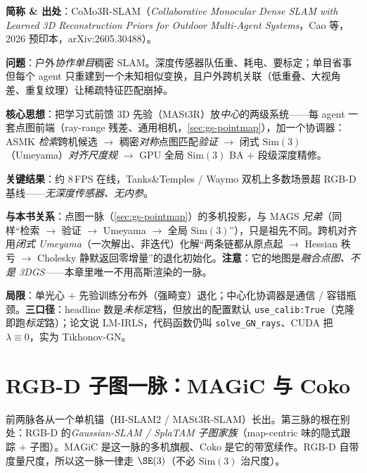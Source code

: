 \begin{paper}
\textbf{简称 \& 出处}：CoMo3R-SLAM（\emph{Collaborative Monocular Dense SLAM with Learned 3D Reconstruction Priors for Outdoor Multi-Agent Systems}，Cao 等，2026 预印本，arXiv:2605.30488）\cite{cao2026como3rslam}。

\textbf{问题}：户外\emph{协作单目}稠密 SLAM。深度传感器队伍重、耗电、要标定；单目省事但每个 agent 只重建到一个未知相似变换，且户外跨机关联（低重叠、大视角差、重复纹理）让稀疏特征匹配崩掉。

\textbf{核心思想}：把学习式前馈 3D 先验（MASt3R）放\emph{中心}的两级系统——每 agent 一套点图前端（ray-range 残差、通用相机，\cref{sec:gs-pointmap}），加一个协调器：ASMK \emph{检索}跨机候选 $\to$ 稠密\emph{对称}点图匹配\emph{验证} $\to$ 闭式 $\mathrm{Sim}(3)$（Umeyama）\emph{对齐尺度规} $\to$ GPU 全局 $\mathrm{Sim}(3)$ BA $+$ 段级深度精修。

\textbf{关键结果}：约 8\,FPS 在线，Tanks\&Temples / Waymo 双机上多数场景超 RGB-D 基线——\emph{无深度传感器、无内参}。

\textbf{与本书关系}：点图一脉（\cref{sec:gs-pointmap}）的多机投影，与 MAGS \emph{兄弟}（同样“检索 $\to$ 验证 $\to$ Umeyama $\to$ 全局 $\mathrm{Sim}(3)$”），只是祖先不同。跨机对齐用\emph{闭式 Umeyama}（一次解出、非迭代）化解“两条链都从原点起 $\to$ Hessian 秩亏 $\to$ Cholesky 静默返回零增量”的退化初始化。\textbf{注意}：它的地图是\emph{融合点图、不是 3DGS}——本章里唯一不用高斯渲染的一脉。

\textbf{局限}：单光心 $+$ 先验训练分布外（强畸变）退化；中心化协调器是通信 / 容错瓶颈。\textbf{三口径}：headline 数是\emph{未标定}档，但放出的配置默认 \texttt{use\_calib:True}（克隆即跑\emph{标定}路）；论文说 LM-IRLS，代码函数仍叫 \texttt{solve\_GN\_rays}、CUDA 把 $\lambda\!\equiv\!0$，实为 Tikhonov-GN。
\end{paper}

\section{RGB-D 子图一脉：MAGiC 与 Coko}
\label{sec:mags-rgbdsubmap}

前两脉各从一个单机锚（HI-SLAM2 / MASt3R-SLAM）长出。第三脉的根在别处：RGB-D 的\emph{Gaussian-SLAM / SplaTAM 子图家族}（map-centric 味的隐式跟踪 $+$ 子图）。MAGiC 是这一脉的多机旗舰、Coko 是它的带宽续作。RGB-D 自带度量尺度，所以这一脉一律走 $\SE(3)$（不必 $\mathrm{Sim}(3)$ 治尺度）。

